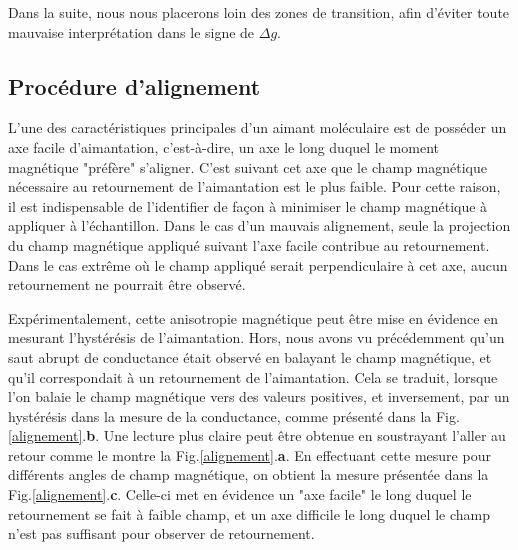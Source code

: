 Dans la suite, nous nous placerons loin des zones de transition, afin d'éviter toute mauvaise interprétation dans le signe de $\Delta g$.


\subsection{Procédure d'alignement}

L'une des caractéristiques principales d'un aimant moléculaire est de posséder un axe facile d'aimantation, c'est-à-dire, un axe le long duquel le moment magnétique "préfère" s'aligner. C'est suivant cet axe que le champ magnétique nécessaire au retournement de l'aimantation est le plus faible. Pour cette raison, il est indispensable de l'identifier de façon à minimiser le champ magnétique à appliquer à l'échantillon. Dans le cas d'un mauvais alignement, seule la projection du champ magnétique appliqué suivant l'axe facile contribue au retournement. Dans le cas extrême où le champ appliqué serait perpendiculaire à cet axe, aucun retournement ne pourrait être observé.

Expérimentalement, cette anisotropie magnétique peut être mise en évidence en mesurant l'hystérésis de l'aimantation. Hors, nous avons vu précédemment qu'un saut abrupt de conductance était observé en balayant le champ magnétique, et qu'il correspondait à un retournement de l'aimantation. Cela se traduit, lorsque l'on balaie le champ magnétique vers des valeurs positives, et inversement, par un hystérésis dans la mesure de la conductance, comme présenté dans la Fig.\ref{alignement}.\textbf{b}. Une lecture plus claire peut être obtenue en soustrayant l'aller au retour comme le montre la Fig.\ref{alignement}.\textbf{a}. En effectuant cette mesure pour différents angles de champ magnétique, on obtient la mesure présentée dans la Fig.\ref{alignement}.\textbf{c}. Celle-ci met en évidence un "axe facile" le long duquel le retournement se fait à faible champ, et un axe difficile le long duquel le champ n'est pas suffisant pour observer de retournement.

